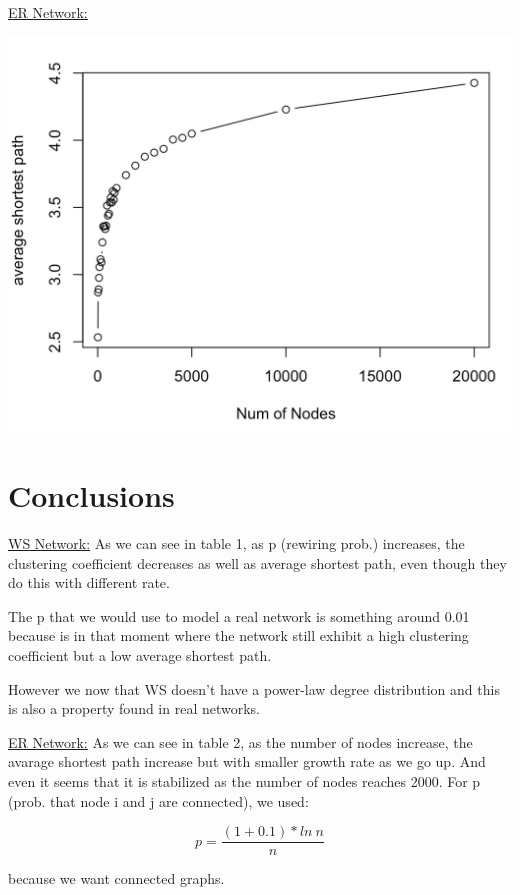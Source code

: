 \documentclass{article}
\begin{document}
\noindent \underline{ER Network:} \newline


\begin{center}
    

\includegraphics[scale=0.5]{img2.png}\newline
\end{center}


\section{Conclusions}

\noindent \underline{WS Network:} As we can see in table 1, as p (rewiring prob.) increases, the clustering coefficient decreases as well as average shortest path, even though they do this with different rate.\newline 

\noindent The p that we would use to model a real network is something around 0.01 because is in that moment where the network still exhibit a high clustering coefficient but a low average shortest path.\newline

\noindent However we now that WS doesn't have a power-law degree distribution and this is also a property found in real networks.\newline

\noindent \underline{ER Network:} As we can see in table 2, as the number of nodes increase, the avarage shortest path increase but with smaller growth rate as we go up. And even it seems that it is stabilized as the number of nodes reaches 2000. For p (prob. that node i and j are connected), we used: \newline

\[ p= \frac{(1+0.1) * ln\ n}{n} \]\newline

\noindent because we want connected graphs. \newline
\end{document}
